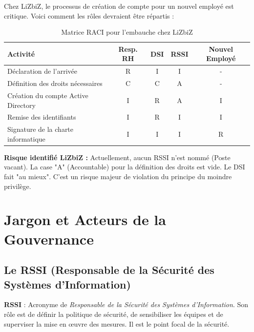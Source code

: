 Chez LiZbiZ, le processus de création de compte pour un nouvel employé est critique. Voici comment les rôles devraient être répartis :

\begin{table}[htbp]
\centering
\small
\begin{tabular}{lcccc}
    \toprule
    \textbf{Activité} & \textbf{Resp. RH} & \textbf{DSI} & \textbf{RSSI} & \textbf{Nouvel Employé} \\
    \midrule
    Déclaration de l'arrivée & R & I & I & - \\
    Définition des droits nécessaires & C & C & A & - \\
    Création du compte Active Directory & I & R & A & I \\
    Remise des identifiants & I & R & I & I \\
    Signature de la charte informatique & I & I & I & R \\
    \bottomrule
\end{tabular}
\caption{Matrice RACI pour l'embauche chez LiZbiZ}
\end{table}

\begin{boxalert}
\textbf{Risque identifié LiZbiZ :} Actuellement, aucun RSSI n'est nommé (Poste vacant). La case "A" (Accountable) pour la définition des droits est vide. Le DSI fait "au mieux". C'est un risque majeur de violation du principe du moindre privilège.
\end{boxalert}

\section{Jargon et Acteurs de la Gouvernance}

\subsection{Le RSSI (Responsable de la Sécurité des Systèmes d'Information)}

\begin{boxdef}
\textbf{RSSI} : Acronyme de \textit{Responsable de la Sécurité des Systèmes d'Information}. Son rôle est de définir la politique de sécurité, de sensibiliser les équipes et de superviser la mise en œuvre des mesures. Il est le point focal de la sécurité.
\end{boxdef}

